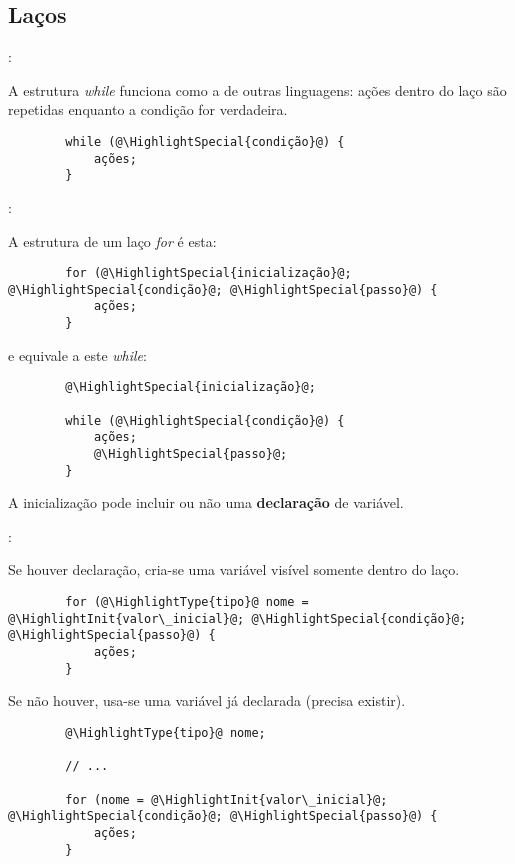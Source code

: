 \subsection{Laços}


\begin{frame}[fragile]{\insertsection: \insertsubsection}

	A estrutura \textit{while} funciona como a de outras linguagens: ações dentro do laço são repetidas enquanto a condição for verdadeira.
	\begin{verbatim}
		while (@\HighlightSpecial{condição}@) {
			ações;
		}
	\end{verbatim}

\end{frame}


\begin{frame}[fragile]{\insertsection: \insertsubsection}

	A estrutura de um laço \textit{for} é esta:
	\begin{verbatim}
		for (@\HighlightSpecial{inicialização}@; @\HighlightSpecial{condição}@; @\HighlightSpecial{passo}@) {
			ações;
		}
	\end{verbatim}
	e equivale a este \textit{while}:
	\begin{verbatim}
		@\HighlightSpecial{inicialização}@;

		while (@\HighlightSpecial{condição}@) {
			ações;
			@\HighlightSpecial{passo}@;
		}
	\end{verbatim}

	A inicialização pode incluir ou não uma \textbf{declaração} de variável.

\end{frame}


\begin{frame}[fragile]{\insertsection: \insertsubsection}

	Se houver declaração, cria-se uma variável visível somente dentro do laço.
	\begin{verbatim}
		for (@\HighlightType{tipo}@ nome = @\HighlightInit{valor\_inicial}@; @\HighlightSpecial{condição}@; @\HighlightSpecial{passo}@) {
			ações;
		}
	\end{verbatim}

	Se não houver, usa-se uma variável já declarada (precisa existir).
	\begin{verbatim}
		@\HighlightType{tipo}@ nome;

		// ...

		for (nome = @\HighlightInit{valor\_inicial}@; @\HighlightSpecial{condição}@; @\HighlightSpecial{passo}@) {
			ações;
		}
	\end{verbatim}

\end{frame}


